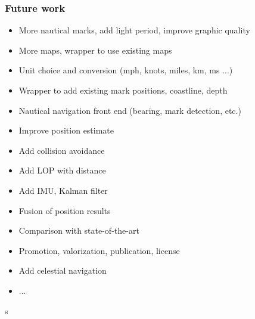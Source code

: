 \documentclass{beamer}
\begin{document}
\begin{frame}
    \frametitle{Future work}
    \begin{itemize}
        \item More nautical marks, add light period, improve graphic quality
        \item More maps, wrapper to use existing maps
        \item Unit choice and conversion (mph, knots, miles, km, ms ...)
        \item Wrapper to add existing mark positions, coastline, depth
        \item Nautical navigation front end (bearing, mark detection, etc.)
        \item Improve position estimate
        \item Add collision avoidance
        \item Add LOP with distance
        \item Add IMU, Kalman filter
        \item Fusion of position results
        \item Comparison with state-of-the-art
        \item Promotion, valorization, publication, license
        \item Add celestial navigation
        \item ...
    \end{itemize}s
\end{frame}
\end{document}

